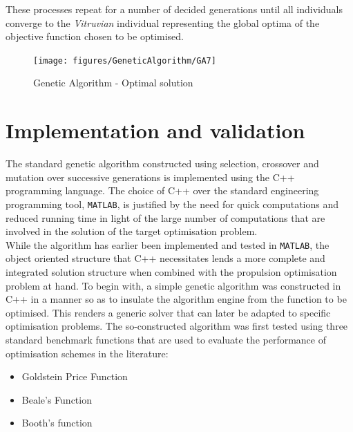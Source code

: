 \documentclass[ExampleMasters.tex]{subfiles}
\begin{document}
		These processes repeat for a number of decided generations until all individuals converge to the \textit{Vitruvian} individual representing the global optima of the objective function chosen to be optimised.\\

		\begin{figure}[H]
			\centering
			\texttt{[image: figures/GeneticAlgorithm/GA7]}
			\caption{Genetic Algorithm - Optimal solution}
			\label{GA7}
		\end{figure}



	\section{Implementation and validation}
		The standard genetic algorithm constructed using selection, crossover and mutation over successive generations is implemented using the C++ programming language. The choice of C++ over the standard engineering programming tool, \verb!MATLAB!, is justified by the need for quick computations and reduced running time in light of the large number of computations that are involved in the solution of the target optimisation problem. \\

		While the algorithm has earlier been implemented and tested in \verb!MATLAB!, the object oriented structure that C++ necessitates lends a more complete and integrated solution structure when combined with the propulsion optimisation problem at hand. To begin with, a simple genetic algorithm was constructed in C++ in a manner so as to insulate the algorithm engine from the function to be optimised. This renders a generic solver that can later be adapted to specific optimisation problems. The so-constructed algorithm was first tested using three standard benchmark functions that are used to evaluate the performance of optimisation schemes in the literature:
		\begin{itemize}
			\item Goldstein Price Function
			\item Beale's Function
			\item Booth's function
		\end{itemize}
\end{document}
